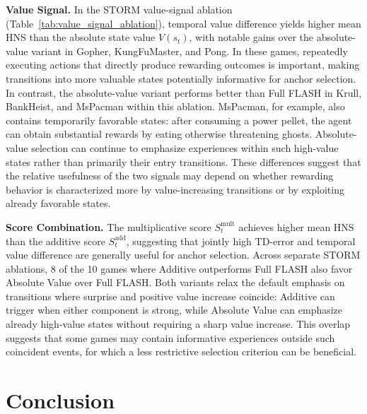 \documentclass{article} %
\begin{document}
\noindent\textbf{Value Signal.} In the STORM value-signal ablation (Table~\ref{tab:value_signal_ablation}), temporal value difference yields higher mean HNS than the absolute state value $V(s_t)$, with notable gains over the absolute-value variant in Gopher, KungFuMaster, and Pong. In these games, repeatedly executing actions that directly produce rewarding outcomes is important, making transitions into more valuable states potentially informative for anchor selection. In contrast, the absolute-value variant performs better than Full FLASH in Krull, BankHeist, and MsPacman within this ablation. MsPacman, for example, also contains temporarily favorable states: after consuming a power pellet, the agent can obtain substantial rewards by eating otherwise threatening ghosts. Absolute-value selection can continue to emphasize experiences within such high-value states rather than primarily their entry transitions. These differences suggest that the relative usefulness of the two signals may depend on whether rewarding behavior is characterized more by value-increasing transitions or by exploiting already favorable states.

\noindent\textbf{Score Combination.} The multiplicative score $S_t^{\mathrm{mult}}$ achieves higher mean HNS than the additive score $S_t^{\mathrm{add}}$, suggesting that jointly high TD-error and temporal value difference are generally useful for anchor selection. Across separate STORM ablations, 8 of the 10 games where Additive outperforms Full FLASH also favor Absolute Value over Full FLASH. Both variants relax the default emphasis on transitions where surprise and positive value increase coincide: Additive can trigger when either component is strong, while Absolute Value can emphasize already high-value states without requiring a sharp value increase. This overlap suggests that some games may contain informative experiences outside such coincident events, for which a less restrictive selection criterion can be beneficial.

\section{Conclusion}
\label{sec:conclusion}
\end{document}
